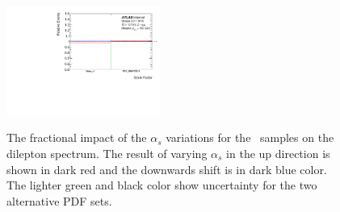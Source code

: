 \begin{figure}[h!]
  \centering
  \includegraphics[page=2,width=0.45\textwidth]{figures/syst_alphaS.pdf} \\
  \caption{The fractional impact of the $\alpha_{s}$ variations for the \sherpa~samples on the dilepton \pt spectrum. The result of varying $\alpha_{s}$ in the up direction is shown in dark red and the downwards shift is in dark blue color. The lighter green and black color show uncertainty for the two alternative PDF sets.}
  \label{fig:alpha_S}
\end{figure}
